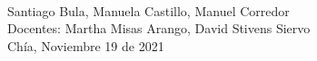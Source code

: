 \begin{titlepage}
\begin{minipage}{14cm}
\HRule \\[1.5cm]


{\Large
Santiago Bula,
Manuela Castillo,
Manuel Corredor } \\[1cm]


{\Large
Docentes: Martha Misas Arango,
David Stivens Siervo} \\[2cm]

{\large
Chía, Noviembre 19 de 2021
}

\end{minipage}

\vfill %

\cleardoublepage
\thispagestyle{empty}
\end{titlepage}

\raggedbottom


